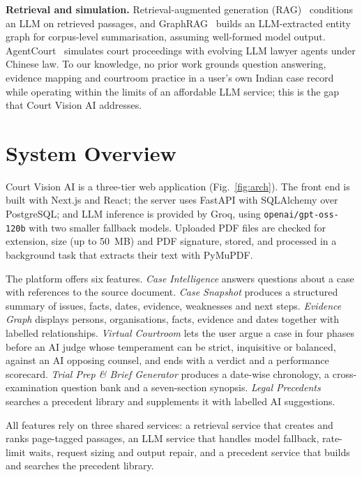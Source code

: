 \documentclass[conference]{IEEEtran}
\begin{document}
\textbf{Retrieval and simulation.} Retrieval-augmented generation (RAG)~\cite{lewis2020rag} conditions an LLM on retrieved passages, and GraphRAG~\cite{edge2024graphrag} builds an LLM-extracted entity graph for corpus-level summarisation, assuming well-formed model output. AgentCourt~\cite{chen2025agentcourt} simulates court proceedings with evolving LLM lawyer agents under Chinese law. To our knowledge, no prior work grounds question answering, evidence mapping and courtroom practice in a user's own Indian case record while operating within the limits of an affordable LLM service; this is the gap that Court Vision AI addresses.

\section{System Overview}
Court Vision AI is a three-tier web application (Fig.~\ref{fig:arch}). The front end is built with Next.js and React; the server uses FastAPI with SQLAlchemy over PostgreSQL; and LLM inference is provided by Groq, using \texttt{openai/gpt-oss-120b} with two smaller fallback models. Uploaded PDF files are checked for extension, size (up to 50~MB) and PDF signature, stored, and processed in a background task that extracts their text with PyMuPDF.

The platform offers six features. \emph{Case Intelligence} answers questions about a case with references to the source document. \emph{Case Snapshot} produces a structured summary of issues, facts, dates, evidence, weaknesses and next steps. \emph{Evidence Graph} displays persons, organisations, facts, evidence and dates together with labelled relationships. \emph{Virtual Courtroom} lets the user argue a case in four phases before an AI judge whose temperament can be strict, inquisitive or balanced, against an AI opposing counsel, and ends with a verdict and a performance scorecard. \emph{Trial Prep \& Brief Generator} produces a date-wise chronology, a cross-examination question bank and a seven-section synopsis. \emph{Legal Precedents} searches a precedent library and supplements it with labelled AI suggestions.

All features rely on three shared services: a retrieval service that creates and ranks page-tagged passages, an LLM service that handles model fallback, rate-limit waits, request sizing and output repair, and a precedent service that builds and searches the precedent library.
\end{document}
